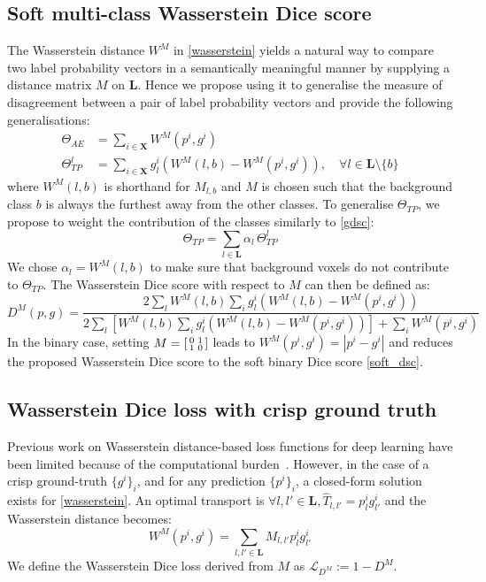 \documentclass[runningheads,orivec,a4paper]{llncs}
\begin{document}
\subsection{Soft multi-class Wasserstein Dice score}
The Wasserstein distance $W^M$ in \eqref{wasserstein} yields a natural way to 
compare two label probability vectors in a semantically meaningful
manner by supplying a distance matrix $M$ on $\mathbf{L}$.
Hence we propose using it
to generalise the
measure of disagreement between a pair of label probability vectors
and provide the following generalisations:
\begin{align}\label{wass_AE}
\Theta_{AE} &= \sum_{i \in \mathbf{X}} W^M(p^i, g^i) \\
\Theta_{TP}^l &= \sum_{i \in \mathbf{X}}g^i_l(W^M(l, b) - W^M(p^i, g^i)),
                \quad \forall l \in \mathbf{L}\setminus\{b\}
\end{align}
where $W^M(l, b)$ is shorthand for $M_{l,b}$ and $M$ is
chosen such that the background class $b$ is always the furthest away
from the other classes. 
To generalise $\Theta_{TP}$, we propose to
weight the contribution of the classes similarly to
\eqref{gdsc}: 
\begin{equation}\label{wass_TP}
\Theta_{TP} = \sum_{l \in \mathbf{L}} \alpha_{l} \,\Theta_{TP}^l
\end{equation}
We chose
$\alpha_{l}=W^M(l, b)$ to make sure that background voxels do not contribute to $\Theta_{TP}$.
\noindent The Wasserstein Dice score with respect to $M$ can then be defined as:
\begin{equation}\label{generalised dice}
D^M(p, g) = \frac{ 2\sum_{l} W^M(l, b)\sum_{i} g^i_l(W^M(l, b) - W^M(p^i, g^i))}{2\sum_{l}[ W^M(l, b)\sum_{i} g^i_l(W^M(l, b) - W^M(p^i, g^i)) ] + \sum_{i} W^M(p^i, g^i)}
\end{equation}
In the binary case, setting  
$M= \begin{bsmallmatrix}
0       & 1  \\
1       & 0  \\
\end{bsmallmatrix}$ leads to $W^M(p^i,g^i)=|p^i-g^i|$ and reduces the proposed
Wasserstein Dice score to the soft binary Dice score
\eqref{soft_dsc}. 

\subsection{Wasserstein Dice loss with crisp ground truth}
Previous work on Wasserstein distance-based loss functions for deep
learning have been limited because of the computational
burden~\cite{fast_emd}. However, in the case of a crisp
ground-truth $\{g^i\}_i$, and for any prediction $\{p^i\}_i$, a
closed-form solution exists for \eqref{wasserstein}.
An optimal transport is $\forall l,l' \in \mathbf{L},
\hat{T}_{l,l'}=p^i_lg^i_{l'}$ and the Wasserstein distance becomes: 
\begin{equation}\label{wass_closed-form}
W^M(p^i, g^i) = \sum_{l,l' \in \mathbf{L}} M_{l,l'}p^i_lg^i_{l'}
\end{equation}
We define the Wasserstein Dice loss derived from $M$ as $\mathcal{L}_{D^M}:=1-D^M$.
\end{document}
